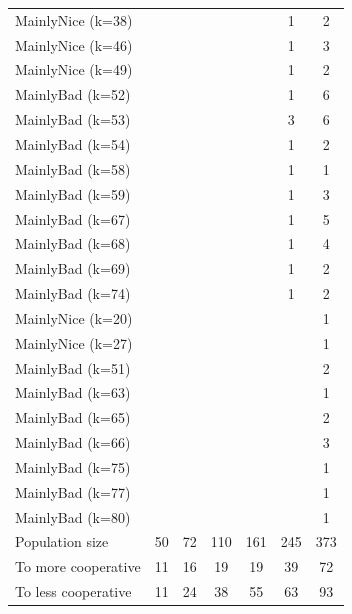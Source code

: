 \documentclass[journal,10pt,twoside]{IEEEtran}
\begin{document}
\begin{table}[ht]
\begin{minipage}{.4\textwidth}
\begin{tabular}{l|cccccc}
        MainlyNice (k=38)   &     &     &      &      &    1 &    2 \\
        MainlyNice (k=46)   &     &     &      &      &    1 &    3 \\
        MainlyNice (k=49)   &     &     &      &      &    1 &    2 \\
        MainlyBad (k=52)    &     &     &      &      &    1 &    6 \\
        MainlyBad (k=53)    &     &     &      &      &    3 &    6 \\
        MainlyBad (k=54)    &     &     &      &      &    1 &    2 \\
        MainlyBad (k=58)    &     &     &      &      &    1 &    1 \\
        MainlyBad (k=59)    &     &     &      &      &    1 &    3 \\
        MainlyBad (k=67)    &     &     &      &      &    1 &    5 \\
        MainlyBad (k=68)    &     &     &      &      &    1 &    4 \\
        MainlyBad (k=69)    &     &     &      &      &    1 &    2 \\
        MainlyBad (k=74)    &     &     &      &      &    1 &    2 \\
        MainlyNice (k=20)   &     &     &      &      &      &    1 \\
        MainlyNice (k=27)   &     &     &      &      &      &    1 \\
        MainlyBad (k=51)    &     &     &      &      &      &    2 \\
        MainlyBad (k=63)    &     &     &      &      &      &    1 \\
        MainlyBad (k=65)    &     &     &      &      &      &    2 \\
        MainlyBad (k=66)    &     &     &      &      &      &    3 \\
        MainlyBad (k=75)    &     &     &      &      &      &    1 \\
        MainlyBad (k=77)    &     &     &      &      &      &    1 \\
        MainlyBad (k=80)    &     &     &      &      &      &    1 \\ \midrule
        Population size     &  50 &  72 &  110 &  161 &  245 &  373 \\
        To more cooperative &  11 &  16 &   19 &   19 &   39 &   72 \\
        To less cooperative &  11 &  24 &   38 &   55 &   63 &   93 \\ \bottomrule
    \end{tabular}
    \end{minipage}
\end{table}
\end{document}
